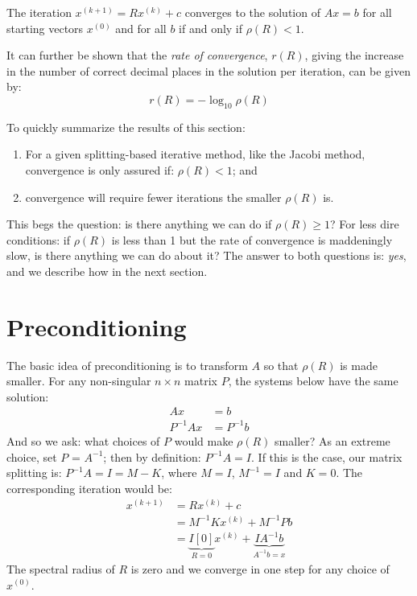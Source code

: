 \begin{theorem}
The iteration $x^{(k+1)} = Rx^{(k)} + c$ converges to the solution of $Ax=b$ for all starting vectors $x^{(0)}$ and for all $b$ if and only if $\rho(R)<1$.
\end{theorem}
It can further be shown that the \emph{rate of convergence}, $r(R)$, giving the increase in the number of correct decimal places in the solution per iteration, can be given by:
\begin{equation}
r(R) = -\log_{10}\rho(R)
\end{equation}

To quickly summarize the results of this section:
\begin{enumerate}
\item For a given splitting-based iterative method, like the Jacobi method, convergence is only assured if: $\rho(R)< 1$; and
\item convergence will require fewer iterations the smaller $\rho(R)$ is.
\end{enumerate}

This begs the question: is there anything we can do if $\rho(R)\ge 1$?  For less dire conditions: if $\rho(R)$ is less than 1 but the rate of convergence is maddeningly slow, is there anything we can do about it?  The answer to both questions is: \emph{yes}, and we describe how in the next section.

\section{Preconditioning}
The basic idea of preconditioning is to transform $A$ so that $\rho(R)$ is made smaller.  For any non-singular $n \times n$ matrix $P$, the systems below have the same solution:
\begin{align*}
Ax &= b \\
P^{-1}Ax &= P^{-1}b
\end{align*}
And so we ask: what choices of $P$ would make $\rho(R)$ smaller?  As an extreme choice, set $P$ = $A^{-1}$; then by definition: $P^{-1}A = I$.  If this is the case, our matrix splitting is: $P^{-1}A = I = M - K$, where $M=I$, $M^{-1}=I$ and $K=0$.  The corresponding iteration would be:
\begin{align*}
x^{(k+1)} &= Rx^{(k)} + c \\
&= M^{-1}Kx^{(k)} + M^{-1}Pb \\
&= \underbrace{I[0]}_{R = 0}x^{(k)} + \underbrace{IA^{-1}b}_{A^{-1}b = x}
\end{align*}
The spectral radius of $R$ is zero and we converge in one step for any choice of $x^{(0)}$.

